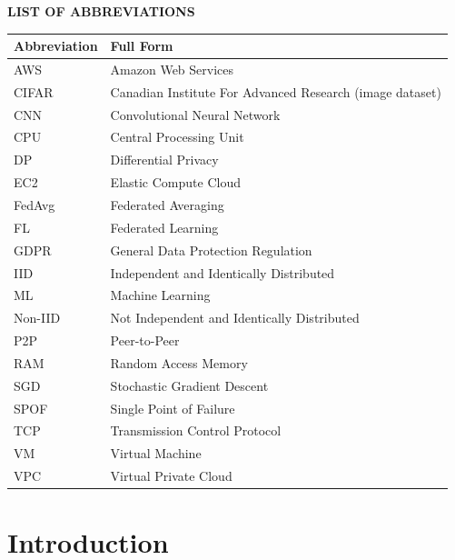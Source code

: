 \documentclass[12pt]{report}
\begin{document}
\newpage
\begin{center}
\textbf{\Large LIST OF ABBREVIATIONS}
\end{center}
\vspace{0.5cm}
\begin{tabular}{@{}lp{10cm}@{}}
\toprule
\textbf{Abbreviation} & \textbf{Full Form} \\
\midrule
AWS      & Amazon Web Services \\[2pt]
CIFAR    & Canadian Institute For Advanced Research (image dataset) \\[2pt]
CNN      & Convolutional Neural Network \\[2pt]
CPU      & Central Processing Unit \\[2pt]
DP       & Differential Privacy \\[2pt]
EC2      & Elastic Compute Cloud \\[2pt]
FedAvg   & Federated Averaging \\[2pt]
FL       & Federated Learning \\[2pt]
GDPR     & General Data Protection Regulation \\[2pt]
IID      & Independent and Identically Distributed \\[2pt]
ML       & Machine Learning \\[2pt]
Non-IID  & Not Independent and Identically Distributed \\[2pt]
P2P      & Peer-to-Peer \\[2pt]
RAM      & Random Access Memory \\[2pt]
SGD      & Stochastic Gradient Descent \\[2pt]
SPOF     & Single Point of Failure \\[2pt]
TCP      & Transmission Control Protocol \\[2pt]
VM       & Virtual Machine \\[2pt]
VPC      & Virtual Private Cloud \\[2pt]
\bottomrule
\end{tabular}

\newpage
{}
\setcounter{page}{1}
\onehalfspacing

\chapter{Introduction}
\end{document}
